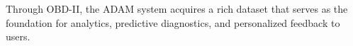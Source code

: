 Through OBD-II, the ADAM system acquires a rich dataset that serves as the foundation for analytics, predictive diagnostics, and personalized feedback to users.









